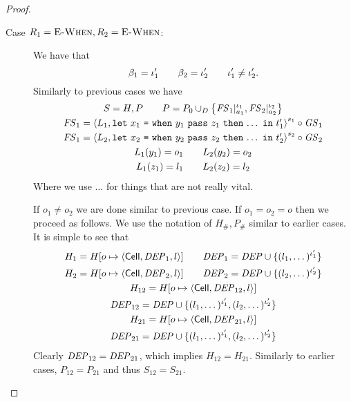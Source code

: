 \begin{proof}
\begin{description}
    \item[Case $R_1 = \mbox{{\sc E-When}}, R_2 = \mbox{{\sc E-When}}$:] We have that
      \begin{equation}
        \beta_1 = \iota'_1 \quad\quad \beta_2 = \iota'_2 \quad\quad \iota'_1 \neq
        \iota'_2.
      \end{equation}
      Similarly to previous cases we have
      \begin{equation}
        \begin{gathered}
          S = H, P \quad\quad P = P_0 \cup_D \left\{ \mathit{FS}_1|_{a_1}^{\iota_1},
          \mathit{FS}_2|_{a_2}^{\iota_2} \right\} \\
          \mathit{FS}_1 = \mbox{$\langle L_1, \mbox{\mdseries\texttt{let}~$x_1$~\texttt{=}~$\mbox{\mdseries\texttt{when}~$y_1$~\texttt{pass}~$z_1$~\texttt{then}~$\dots$}$~\texttt{in}~$t'_1$} \rangle$}^{s_1} \circ \mathit{GS}_1
          \\ 
          \mathit{FS}_1 = \mbox{$\langle L_2, \mbox{\mdseries\texttt{let}~$x_2$~\texttt{=}~$\mbox{\mdseries\texttt{when}~$y_2$~\texttt{pass}~$z_2$~\texttt{then}~$\dots$}$~\texttt{in}~$t'_2$} \rangle$}^{s_2}
          \circ \mathit{GS}_2 \\
          L_1(y_1) = o_1 \quad\quad L_2(y_2) = o_2 \\
          L_1(z_1) = l_1 \quad\quad L_2(z_2) = l_2
        \end{gathered}
      \end{equation}
      Where we use $\dots$ for things that are not really vital.

      If $o_1 \neq o_2$ we are done similar to previous case. If $o_1 = o_2 = o$
      then we proceed as follows. We use the notation of
      $H_{\text{\#}}, P_{\text{\#}}$ similar to earlier cases. It
      is simple to see that
      \begin{equation}
        \begin{gathered}
          H_1 = H[o \mapsto \mbox{$\langle \mbox{$\mathsf{Cell}$}{}, \mathit{DEP}_1, l \rangle$}] \quad\quad \mathit{DEP}_1 = \mathit{DEP} \cup \{ (l_1,
          \dots)^{\iota'_1} \} \\
          H_2 = H[o \mapsto \mbox{$\langle \mbox{$\mathsf{Cell}$}{}, \mathit{DEP}_2, l \rangle$}] \quad\quad \mathit{DEP}_2 = \mathit{DEP} \cup \{ (l_2,
          \dots)^{\iota'_2} \} \\
          H_{12} = H[o \mapsto \mbox{$\langle \mbox{$\mathsf{Cell}$}{}, \mathit{DEP}_{12}, l \rangle$}] \\ \mathit{DEP}_{12} = \mathit{DEP} \cup \{ (l_1,
          \dots)^{\iota'_1}, (l_2, \dots)^{\iota'_2} \} \\
          H_{21} = H[o \mapsto \mbox{$\langle \mbox{$\mathsf{Cell}$}{}, \mathit{DEP}_{21}, l \rangle$}] \\ \mathit{DEP}_{21} = \mathit{DEP} \cup \{ (l_1,
          \dots)^{\iota'_1}, (l_2, \dots)^{\iota'_2} \} \\
        \end{gathered}
      \end{equation}
      Clearly $\mathit{DEP}_{12} = \mathit{DEP}_{21}$, which implies $H_{12} = H_{21}$.
      Similarly to earlier cases, $P_{12} = P_{21}$ and thus $S_{12} = S_{21}$.


\end{description}
\end{proof}
